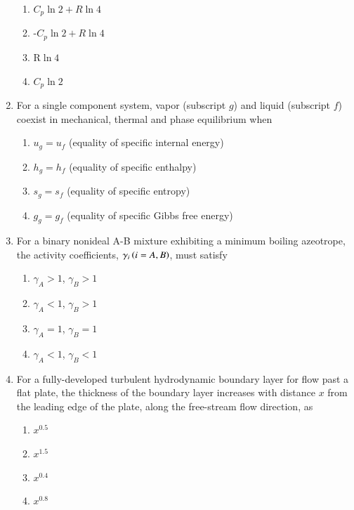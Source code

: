 \documentclass[journal,12pt,onecolumn]{IEEEtran}
\theoremstyle{remark}
\begin{document}
\begin{enumerate}
    \begin{enumerate}
        \item $C_p\ln{2} + R\ln{4}$
        \item -$C_p \ln{2} + R\ln{4}$
        \item R$\ln{4}$
        \item $C_p \ln{2}$
    \end{enumerate}

    

    \item For a single component system, vapor (subscript $g$) and liquid (subscript $f$) coexist in mechanical, thermal and phase equilibrium when 
    
 \hfill{}
\begin{enumerate}
    \item $u_g = u_f$ (equality of specific internal energy)
    \item $h_g = h_f$ (equality of specific enthalpy)
    \item $s_g = s_f$ (equality of specific entropy)
    \item $g_g = g_f$ (equality of specific Gibbs free energy)
\end{enumerate}

    \item  For a binary nonideal A-B mixture exhibiting a minimum boiling azeotrope, the activity coefficients, $\gamma_i\left(i = A,B\right)$, must satisfy
    
 \hfill{}
\begin{enumerate}
    \item $\gamma_A > 1$, $\gamma_B > 1$
    \item $\gamma_A < 1$, $\gamma_B > 1$
    \item $\gamma_A = 1$, $\gamma_B = 1$
    \item $\gamma_A < 1$, $\gamma_B < 1$
\end{enumerate}

    \item For a fully-developed turbulent hydrodynamic boundary layer for flow past a flat plate, the thickness of the boundary layer increases with distance $x$ from the leading edge of the plate, along the free-stream flow direction, as
    
     \hfill{}
\begin{multicols}{4}
    \begin{enumerate}
        \item $x^{0.5}$
        \item $x^{1.5}$
        \item $x^{0.4}$
        \item $x^{0.8}$
    \end{enumerate}
\end{multicols}


\end{enumerate}
\end{document}
